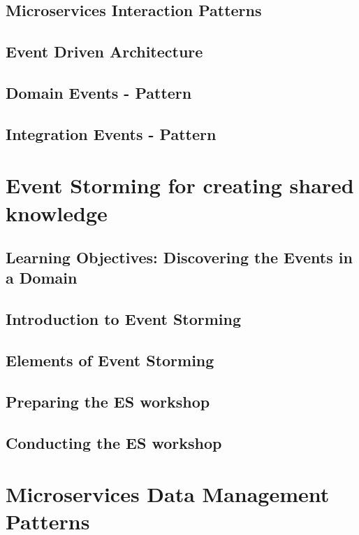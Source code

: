 \documentclass[a4paper, 11pt]{book}
\begin{document}
    \section{Microservices Interaction Patterns}


    \section{Event Driven Architecture}


    \section{Domain Events - Pattern}


    \section{Integration Events - Pattern}


    \chapter{Event Storming for creating shared knowledge}


    \section{Learning Objectives: Discovering the Events in a Domain}


    \section{Introduction to Event Storming}


    \section{Elements of Event Storming}


    \section{Preparing the ES workshop}


    \section{Conducting the ES workshop}


    \chapter{Microservices Data Management Patterns}
\end{document}

